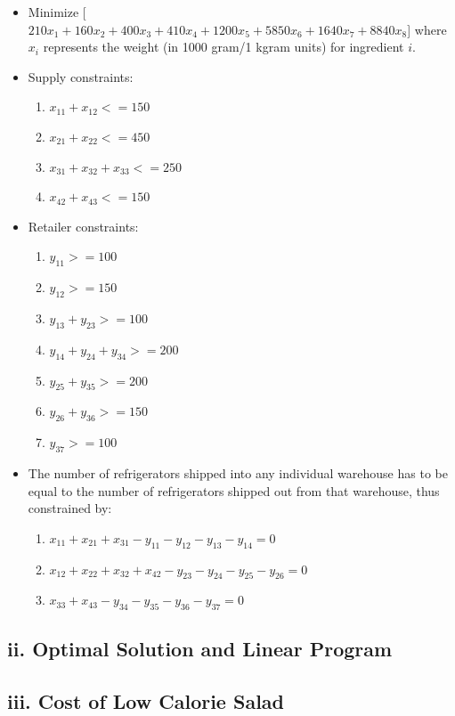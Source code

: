 \documentclass[11pt]{scrreprt}
\begin{document}
\begin{itemize}
	\item Minimize
[$210x_{1}+160x_{2}+400x_{3}+410x_{4}+1200x_{5}+5850x_{6}+1640x_{7}+8840x_{8}$]
where $x_{i}$ represents the weight (in 1000 gram/1 kgram units) for ingredient $i$.
	\item Supply constraints:
	\begin{enumerate}
		\item $x_{11} + x_{12} <= 150$
		\item $x_{21} + x_{22} <= 450$
		\item $x_{31} + x_{32} + x_{33} <= 250$
		\item $x_{42} + x_{43} <= 150$
	\end{enumerate}
	\item Retailer constraints:
	\begin{enumerate}
		\item $y_{11} >= 100$
		\item $y_{12} >= 150$
		\item $y_{13} + y_{23} >= 100$
		\item $y_{14} + y_{24} + y_{34} >= 200$
		\item $y_{25} + y_{35} >= 200$
		\item $y_{26} + y_{36} >= 150$
		\item $y_{37} >= 100$
	\end{enumerate}
	\item The number of refrigerators shipped into any individual 
		warehouse has to be equal to the number of refrigerators 
		shipped out from that warehouse, thus constrained by:
	\begin{enumerate}
		\item $x_{11} + x_{21} + x_{31} - y_{11} - y_{12} - y_{13} - y_{14} = 0$
		\item $x_{12} + x_{22} + x_{32} + x_{42} - y_{23} - y_{24} - y_{25} - y_{26} = 0$
		\item $x_{33} + x_{43} - y_{34} - y_{35} - y_{36} - y_{37} = 0$
	\end{enumerate}
\end{itemize}

\subsection{ii. Optimal Solution and Linear Program}
\subsection{iii. Cost of Low Calorie Salad}
\end{document}
